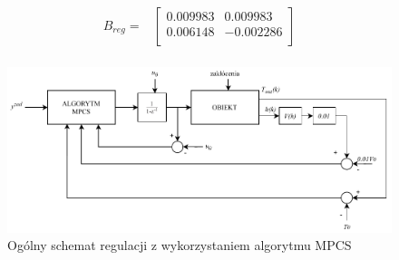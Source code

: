 \begin{equation}
\label{equation:bregval}
    \begin{aligned}
        B_{reg} = &
        \begin{bmatrix}
            0.009983 & 0.009983\\
            0.006148 & -0.002286\\
        \end{bmatrix}\\
    \end{aligned}
\end{equation}

\begin{figure}[h!]
   \centering
   \includegraphics[scale=0.7]{img/MPCSanaRK/MPCSDiag.pdf}
   \caption{Ogólny schemat regulacji z wykorzystaniem algorytmu MPCS}
   \label{fig:mpcs}
\end{figure}


\FloatBarrier
    
\FloatBarrier

\FloatBarrier
    
\FloatBarrier

\FloatBarrier
    
\FloatBarrier

\FloatBarrier
    
\FloatBarrier

\FloatBarrier
    
\FloatBarrier

\FloatBarrier
    
\FloatBarrier